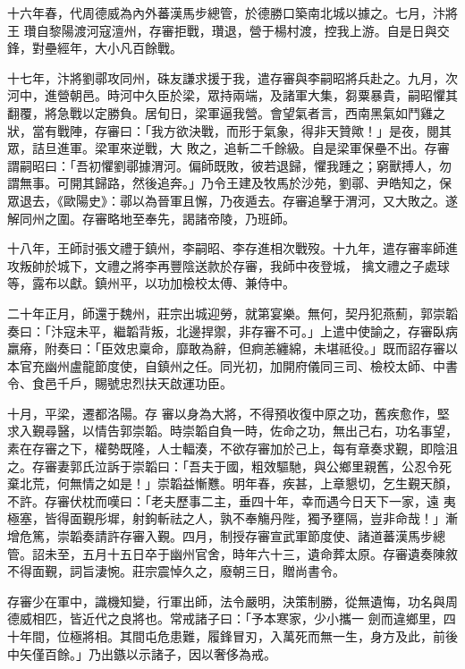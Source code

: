 \begin{pinyinscope}
 十六年春，代周德威為內外蕃漢馬步總管，於德勝口築南北城以據之。七月，汴將王
 瓚自黎陽渡河寇澶州，存審拒戰，瓚退，營于楊村渡，控我上游。自是日與交鋒，對壘經年，大小凡百餘戰。



 十七年，汴將劉鄩攻同州，硃友謙求援于我，遣存審與李嗣昭將兵赴之。九月，次河中，進營朝邑。時河中久臣於梁，眾持兩端，及諸軍大集，芻粟暴貴，嗣昭懼其翻覆，將急戰以定勝負。居旬日，梁軍逼我營。會望氣者言，西南黑氣如鬥雞之狀，當有戰陣，存審曰：「我方欲決戰，而形于氣象，得非天贊歟！」是夜，閱其眾，詰旦進軍。梁軍來逆戰，大
 敗之，追斬二千餘級。自是梁軍保壘不出。存審謂嗣昭曰：「吾初懼劉鄩據渭河。偏師既敗，彼若退歸，懼我踵之；窮獸搏人，勿謂無事。可開其歸路，然後追奔。」乃令王建及牧馬於沙苑，劉鄩、尹皓知之，保眾退去，《歐陽史》：鄩以為晉軍且懈，乃夜遁去。存審追擊于渭河，又大敗之。遂解同州之圍。存審略地至奉先，謁諸帝陵，乃班師。



 十八年，王師討張文禮于鎮州，李嗣昭、李存進相次戰歿。十九年，遣存審率師進攻叛帥於城下，文禮之將李再豐陰送款於存審，我師中夜登城，
 擒文禮之子處球等，露布以獻。鎮州平，以功加檢校太傅、兼侍中。



 二十年正月，師還于魏州，莊宗出城迎勞，就第宴樂。無何，契丹犯燕薊，郭崇韜奏曰：「汴寇未平，繼韜背叛，北邊捍禦，非存審不可。」上遣中使諭之，存審臥病羸瘠，附奏曰：「臣效忠稟命，靡敢為辭，但痾恙纏綿，未堪祗役。」既而詔存審以本官充幽州盧龍節度使，自鎮州之任。同光初，加開府儀同三司、檢校太師、中書令、食邑千戶，賜號忠烈扶天啟運功臣。



 十月，平梁，遷都洛陽。存
 審以身為大將，不得預收復中原之功，舊疾愈作，堅求入覲尋醫，以情告郭崇韜。時崇韜自負一時，佐命之功，無出己右，功名事望，素在存審之下，權勢既隆，人士輻湊，不欲存審加於己上，每有章奏求覲，即陰沮之。存審妻郭氏泣訴于崇韜曰：「吾夫于國，粗效驅馳，與公鄉里親舊，公忍令死棄北荒，何無情之如是！」崇韜益慚戁。明年春，疾甚，上章懇切，乞生覲天顏，不許。存審伏枕而嘆曰：「老夫歷事二主，垂四十年，幸而遇今日天下一家，遠
 夷極塞，皆得面覲彤墀，射鉤斬祛之人，孰不奉觴丹陛，獨予壅隔，豈非命哉！」漸增危篤，崇韜奏請許存審入覲。四月，制授存審宣武軍節度使、諸道蕃漢馬步總管。詔未至，五月十五日卒于幽州官舍，時年六十三，遺命葬太原。存審遺奏陳敘不得面覲，詞旨淒惋。莊宗震悼久之，廢朝三日，贈尚書令。



 存審少在軍中，識機知變，行軍出師，法令嚴明，決策制勝，從無遺悔，功名與周德威相匹，皆近代之良將也。常戒諸子曰：「予本寒家，少小攜一
 劍而違鄉里，四十年間，位極將相。其間屯危患難，履鋒冒刃，入萬死而無一生，身方及此，前後中矢僅百餘。」乃出鏃以示諸子，因以奢侈為戒。




\end{pinyinscope}
